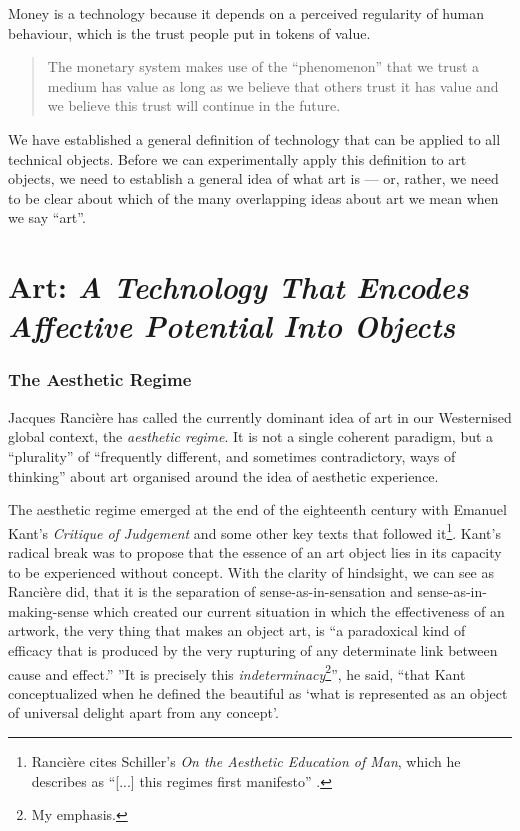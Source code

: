 \documentclass[letterpaper]{article}
\begin{document}
    Money is a technology because it depends on a perceived regularity of human behaviour, which is the trust people put in tokens of value.

    \begin{quote}
        The monetary system makes use of the “phenomenon” that we trust a medium has value as long as we believe that others trust it has value and we believe this trust will continue in the future. \citep[p.55]{theNatureOfTechnology2009}
    \end{quote}

    We have established a general definition of technology that can be applied to all technical objects. Before we can experimentally apply this definition to art objects, we need to establish a general idea of what art is — or, rather, we need to be clear about which of the many overlapping ideas about art we mean when we say “art”.

\section{Art: \emph{A Technology That Encodes Affective Potential Into Objects}}

    \subsubsection{The Aesthetic Regime}

    Jacques Rancière has called the currently dominant idea of art in our Westernised global context, the \emph{aesthetic regime}. It is not a single coherent paradigm, but a “plurality” of “frequently different, and sometimes contradictory, ways of thinking” \citep[p.8]{RanciereMdrnTms2022} about art organised around the idea of aesthetic experience.
    
    The aesthetic regime emerged at the end of the eighteenth century with Emanuel Kant's \emph{Critique of Judgement} and some other key texts that followed it\footnote{
        Rancière cites Schiller's \emph{On the Aesthetic Education of Man}, which he describes as “[...] this regimes first manifesto” \citep[pp.23-24]{RancierPltcsOfThAsthtcs2004}.
    }. Kant's radical break was to propose that the essence of an art object lies in its capacity to be experienced without concept. With the clarity of hindsight, we can see as Rancière did, that it is the separation of sense-as-in-sensation and sense-as-in-making-sense which created our current situation in which the effectiveness of an artwork, the very thing that makes an object art, is “a paradoxical kind of efficacy that is produced by the very rupturing of any determinate link between cause and effect.” \citep[p.51]{RancierThEmncptdSpcttr2009} ”It is precisely this \emph{indeterminacy}\footnote{
        My emphasis.
    }”, he said, “that Kant conceptualized when he defined the beautiful as ‘what is represented as an object of universal delight apart from any concept’. \citep[p.52]{RancierThEmncptdSpcttr2009}
\end{document}
